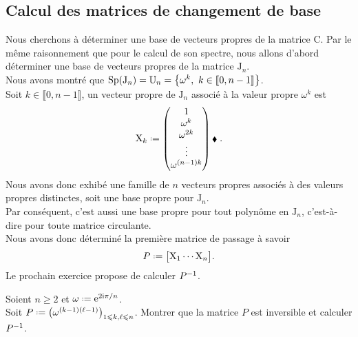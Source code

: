 \subsection{Calcul des matrices de changement de base}

Nous cherchons à déterminer une base de vecteurs propres de la matrice $\mathrm{C}$. Par le même raisonnement que pour le calcul de son spectre, nous allons d'abord déterminer une base de vecteurs propres de la matrice $\mathrm{J}_n$. \\
Nous avons montré que $\mathrm{Sp}(\mathrm{J}_n) = \mathbb{U}_n = \left \{ \omega^k,\ k \in \llbracket 0, n-1 \rrbracket \right \}$. \\
Soit $k \in \llbracket 0, n-1 \rrbracket$, un vecteur propre de $\mathrm{J}_n$ associé à la valeur propre $\omega^k$ est
$$
\mathrm{X}_k \defeq
\begin{pmatrix}
    1 \\
    \omega^k \\
    \omega^{2k} \\
    \vdots \\
    \omega^{(n-1)k}
\end{pmatrix} \note.
$$
Nous avons donc exhibé une famille de $n$ vecteurs propres associés à des valeurs propres distinctes, soit une base propre pour $\mathrm{J}_n$. \\
Par conséquent, c'est aussi une base propre pour tout polynôme en $\mathrm{J}_n$, c'est-à-dire pour toute matrice circulante. \\
Nous avons donc déterminé la première matrice de passage à savoir
$$P \defeq \big[ \mathrm{X}_1 \cdots \mathrm{X}_n \big].$$
Le prochain exercice propose de calculer $P^{-1}$.
\begin{exercice}
    Soient $n \geqslant 2$ et $\omega \defeq \me^{2 \mi \pi / n}$. \\
    Soit $P \defeq \big( \omega^{(k-1)(\ell-1)} \big)_{1 \leqslant k, \ell \leqslant n}$. Montrer que la matrice $P$ est inversible et calculer $P^{-1}$.
\end{exercice}

